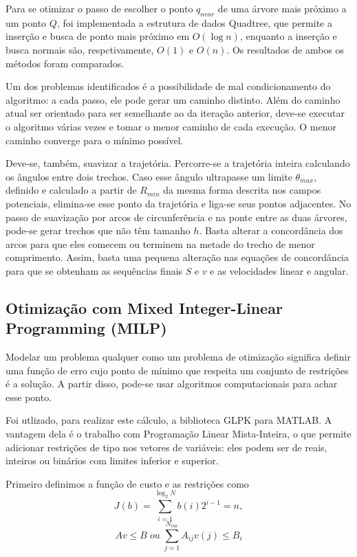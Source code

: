 \documentclass[a4paper,12pt]{article}
\begin{document}
Para se otimizar o passo de escolher o ponto $q_{near}$ de uma árvore mais próximo a um ponto $Q$, foi implementada a estrutura de dados Quadtree, que permite a inserção e busca de ponto mais próximo em $O(\log{n})$, enquanto a inserção e busca normais são, respctivamente, $O(1)$ e $O(n)$. Os resultados de ambos os métodos foram comparados.

Um dos problemas identificados é a possibilidade de mal condicionamento do algoritmo: a cada passo, ele pode gerar um caminho distinto. Além do caminho atual ser orientado para ser semelhante ao da iteração anterior, deve-se executar o algoritmo várias vezes e tomar o menor caminho de cada execução. O menor caminho converge para o mínimo possível.

Deve-se, também, suavizar a trajetória. Percorre-se a trajetória inteira calculando os ângulos entre dois trechos. Caso esse ângulo ultrapasse um limite $\theta_{max}$, definido e calculado a partir de $R_{min}$ da mesma forma descrita nos campos potenciais, elimina-se esse ponto da trajetória e liga-se seus pontos adjacentes. No passo de suavização por arcos de circunferência e na ponte entre as duas árvores, pode-se gerar trechos que não têm tamanho $h$. Basta alterar a concordância dos arcos para que eles comecem ou terminem na metade do trecho de menor comprimento. Assim, basta uma pequena alteração nas equações de concordância para que se obtenham as sequências finais $S$ e $v$ e as velocidades linear e angular.

\subsection{Otimização com Mixed Integer-Linear Programming (MILP)}

Modelar um problema qualquer como um problema de otimização significa definir uma função de erro cujo ponto de mínimo que respeita um conjunto de restrições é a solução. A partir disso, pode-se usar algoritmos computacionais para achar esse ponto.

Foi utlizado, para realizar este cálculo, a biblioteca GLPK para MATLAB. A vantagem dela é o trabalho com Programação Linear Mista-Inteira, o que permite adicionar restrições de tipo nos vetores de variáveis: eles podem ser de reais, inteiros ou binários com limites inferior e superior.

Primeiro definimos a função de custo e as restrições como 
\begin{equation}
	\label{eq:custo}
	J(b) = \sum_{i=1}^{\log_2 {N}} b(i)2^{i-1} = n,
\end{equation}
\begin{equation}
	\label{eq:restr}
	Av \leq B \; ou \; \sum_{j=1}^{N_{var}} A_{ij}v(j)  \leqslant B_i
\end{equation}
\end{document}
